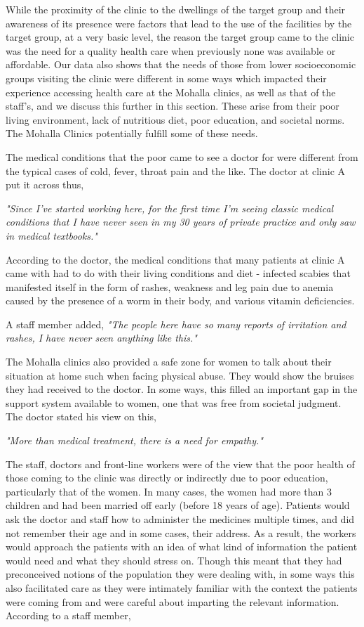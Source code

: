 While the proximity of the clinic to the dwellings of the target group and their awareness of its presence were factors that lead to the use of the facilities by the target group, at a very basic level, the reason the target group came to the clinic was the need for a quality health care when previously none was available or affordable. Our data also shows that the needs of those from lower socioeconomic groups visiting the clinic were different in some ways which impacted their experience accessing health care at the Mohalla clinics, as well as that of the staff's, and we discuss this further in this section. These arise from their poor living environment, lack of nutritious diet, poor education, and societal norms. The Mohalla Clinics potentially fulfill some of these needs.

The medical conditions that the poor came to see a doctor for were different from the typical cases of cold, fever, throat pain and the like. The doctor at clinic A put it across thus,

\textit{"Since I've started working here, for the first time I'm seeing classic medical conditions that I have never seen in my 30 years of private practice and only saw in medical textbooks."}

According to the doctor, the medical conditions that many patients at clinic A came with had to do with their living conditions and diet - infected scabies that manifested itself in the form of rashes, weakness and leg pain due to anemia caused by the presence of a worm in their body, and various vitamin deficiencies.

A staff member added,
\textit{"The people here have so many reports of irritation and rashes, I have never seen anything like this."}

The Mohalla clinics also provided a safe zone for women to talk about their situation at home such when facing physical abuse. They would show the bruises they had received to the doctor. In some ways, this filled an important gap in the support system available to women, one that was free from societal judgment. The doctor stated his view on this, 

\textit{"More than medical treatment, there is a need for empathy."}

The staff, doctors and front-line workers were of the view that the poor health of those coming to the clinic was directly or indirectly due to poor education, particularly that of the women. In many cases, the women had more than 3 children and had been married off early (before 18 years of age). Patients would ask the doctor and staff how to administer the medicines multiple times, and did not remember their age and in some cases, their address. As a result, the workers would approach the patients with an idea of what kind of information the patient would need and what they should stress on. Though this meant that they had preconceived notions of the population they were dealing with, in some ways this also facilitated care as they were intimately familiar with the context the patients were coming from and were careful about imparting the relevant information. According to a staff member,

